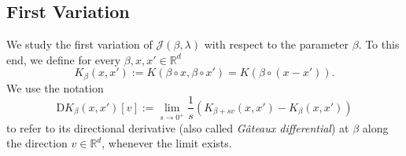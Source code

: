 \documentclass[sn-mathphys-num]{sn-jnl}%
\numberwithin{equation}{section}
\newcommand{\R}{\mathbb{R}}
\newcommand{\kernel}{K}
\newcommand{\norm}[1]{\left\|{#1}\right\|} %
\newtheorem{lemma}{Lemma}
\theoremstyle{thmstyleone}%
\theoremstyle{thmstyletwo}%
\theoremstyle{thmstylethree}%
\begin{document}


\subsection{First Variation} 
\label{sec:first-variation}
We study the first variation of $\mathcal{J}(\beta, \lambda)$ with respect to the parameter $\beta$. 
To this end, we define for every $\beta, x, x' \in \R^d$
\begin{equation*}
	\kernel_\beta(x, x') := \kernel(\beta \circ x, \beta \circ x') = \kernel(\beta \circ (x- x')).
\end{equation*}
We use the notation 
\begin{equation*}
\mathrm{D}\kernel_\beta(x, x')[v] := \lim_{s \to 0^+} \frac{1}{s} (\kernel_{\beta + sv}(x, x') - \kernel_{\beta} (x, x'))
\end{equation*}
to refer to its directional derivative (also called \emph{G\^{a}teaux differential}) at $\beta$ along the direction $v \in \R^d$, whenever the limit exists.
\end{document}
